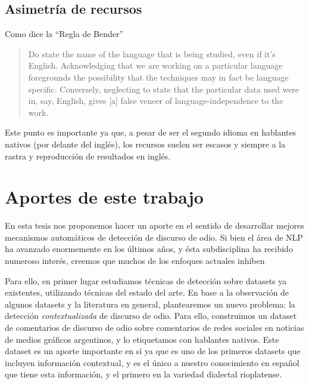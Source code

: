 \subsection{Asimetría de recursos}

Como dice la ``Regla de Bender''\cite{bender2011achieving}

\begin{quote}
    Do state the name of the language that is being studied, even if it's English. Acknowledging that we are working on a particular language foregrounds the possibility that the techniques may in fact be language specific. Conversely, neglecting to state that the particular data used were in, say, English, gives [a] false veneer of language-independence to the work.
\end{quote}

Este punto es importante ya que, a pesar de ser el segundo idioma en hablantes nativos (por delante del inglés), los recursos suelen ser escasos y siempre a la rastra y reproducción de resultados en inglés. 



\section{Aportes de este trabajo}

En esta tesis nos proponemos hacer un aporte en el sentido de desarrollar mejores mecanismos automáticos de detección de discurso de odio. Si bien el área de NLP ha avanzado enormemente en los últimos años, y ésta subdisciplina ha recibido numeroso interés, creemos que muchos de los enfoques actuales inhiben

Para ello, en primer lugar estudiamos técnicas de detección sobre datasets ya existentes, utilizando técnicas del estado del arte. En base a la observación de algunos datasets y la literatura en general, plantearemos un nuevo problema: la detección \emph{contextualizada} de discurso de odio. Para ello, construimos un dataset de comentarios de discurso de odio sobre comentarios de redes sociales en noticias de medios gráficos argentinos, y lo etiquetamos con hablantes nativos. Este dataset es un aporte importante en sí ya que es uno de los primeros datasets que incluyen información contextual, y es el único a nuestro conocimiento en español que tiene esta información, y el primero en la variedad dialectal rioplatense. 


